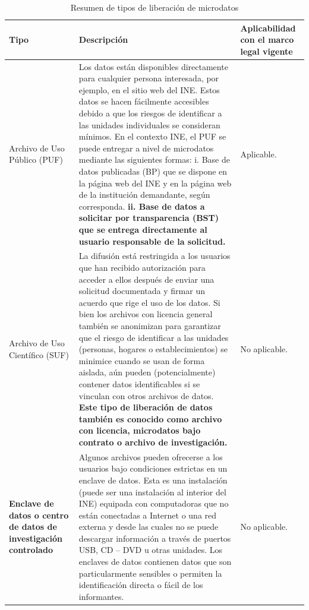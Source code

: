 \documentclass[]{book}
\theoremstyle{definition}
\theoremstyle{definition}
\theoremstyle{definition}
\theoremstyle{definition}
\theoremstyle{remark}
\begin{document}
\begin{table}

\caption{\label{tab:tbl2lbn}Resumen de tipos de liberación de microdatos}
\begin{tabu} to 
\hline
Tipo & Descripción & Aplicabilidad con el marco legal vigente\\
\hline
Archivo de Uso Público (PUF) & Los datos están disponibles directamente para cualquier persona interesada, por ejemplo, en el sitio web del INE. Estos datos se hacen fácilmente accesibles debido a que los riesgos de identificar a las unidades individuales se consideran mínimos.
En el contexto INE, el PUF se puede entregar a nivel de microdatos mediante las siguientes formas:
i. Base de datos publicadas (BP) que se dispone en la página web del INE y en la página web de la institución demandante, según corresponda.
\textbf{ii. Base de datos a solicitar por transparencia (BST) que se entrega directamente al usuario responsable de la solicitud.} & Aplicable.\\
\hline
Archivo de Uso Científico (SUF) & La difusión está restringida a los usuarios que han recibido autorización para acceder a ellos después de enviar una solicitud documentada y firmar un acuerdo que rige el uso de los datos. Si bien los archivos con licencia general también se anonimizan para garantizar que el riesgo de identificar a las unidades (personas, hogares o establecimientos) se minimice cuando se usan de forma aislada, aún pueden (potencialmente) contener datos identificables si se vinculan con otros archivos de datos.
\textbf{Este tipo de liberación de datos también es conocido como archivo con licencia, microdatos bajo contrato o archivo de investigación.} & No aplicable.\\
\hline
\textbf{Enclave de datos o centro de datos de investigación controlado} & Algunos archivos pueden ofrecerse a los usuarios bajo condiciones estrictas en un enclave de datos. Esta es una instalación (puede ser una instalación al interior del INE) equipada con computadoras que no están conectadas a Internet o una red externa y desde las cuales no se puede descargar información a través de puertos USB, CD – DVD u otras unidades. Los enclaves de datos contienen datos que son particularmente sensibles o permiten la identificación directa o fácil de los informantes. & No aplicable.\\
\hline
\end{tabu}
\end{table}
\end{document}

